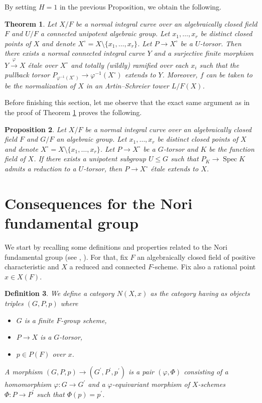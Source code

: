 \documentclass[a4paper,english,12pt]{amsart}
\newtheorem{definition}{Definition}[section]
\newtheorem{theorem}[definition]{Theorem}
\newtheorem{proposition}[definition]{Proposition}
\numberwithin{equation}{section}
\DeclareMathOperator{\Spec}{Spec}
\renewcommand{\leq}{\leqslant}
\renewcommand{\_}{\rule{0.25cm}{0.4pt}}
\begin{document}
By setting $H=1$ in the previous Proposition, we obtain the following.

\begin{theorem}\label{unipotente curvas}
    Let $X/F$ be a normal integral curve over an algebraically closed field $F$ and $U/F$ a connected unipotent algebraic group. Let $x_{1},\dots, x_{r}$ be distinct closed points of $X$ and denote $X^{\circ}=X\setminus\{x_{1},\dots, x_{r}\}$. Let $P\to X^{\circ}$ be a $U$-torsor. Then there exists a normal connected integral curve $Y$ and a surjective finite morphism $Y\xrightarrow{\varphi} X$ étale over $X^{\circ}$ and totally (wildly) ramified over each $x_{i}$ such that the pullback torsor $P_{\varphi^{-1}(X^{\circ})}\to \varphi^{-1}(X^{\circ})$ extends to $Y$. Moreover, $f$ can be taken to be the normalization of $X$ in an Artin--Schreier tower $L/F(X)$.
\end{theorem}

Before finishing this section, let me observe that the exact same argument as in the proof of Theorem \ref{unipotente curvas} proves the following.

\begin{proposition}\label{unipotent generic}
    Let $X/F$ be a normal integral curve over an algebraically closed field $F$ and $G/F$ an algebraic group. Let $x_{1},\dots, x_{r}$ be distinct closed points of $X$ and denote $X^{\circ}=X\setminus\{x_{1},\dots, x_{r}\}$. Let $P\to X^{\circ}$ be a $G$-torsor and $K$ be the function field of $X$. If there exists a unipotent subgroup $U\leq G$ such that $P_{K}\to \Spec K$ admits a reduction to a $U$-torsor, then $P\to X^{\circ}$ étale extends to $X$.
\end{proposition}

\section{Consequences for the Nori fundamental group}\label{5}
We start by recalling some definitions and properties related to the Nori fundamental group (see \cite{Nori}, \cite{Nori1982-tm}). For that, fix $F$ an algebraically closed field of positive characteristic and $X$ a reduced and connected $F$-scheme. Fix also a rational point $x\in X(F)$.

\begin{definition}
We define a category $N(X,x)$ as the category having as objects triples $(G,P,p)$ where
\begin{itemize}
\item $G$ is a finite $F$-group scheme,
\item $P\to X$ is a $G$-torsor,
\item $p\in P(F)$ over $x$.
\end{itemize}
A morphism $(G,P,p)\to (G^{\prime},P^{\prime},p^{\prime})$ is a pair $(\varphi,\Phi)$ consisting of a homomorphism
$\varphi:G\to G^{\prime}$ and a $\varphi$-equivariant morphism of $X$-schemes $\Phi:P\to P^{\prime}$ such that $\Phi(p)=p^{\prime}$.
\end{definition}
\end{document}

